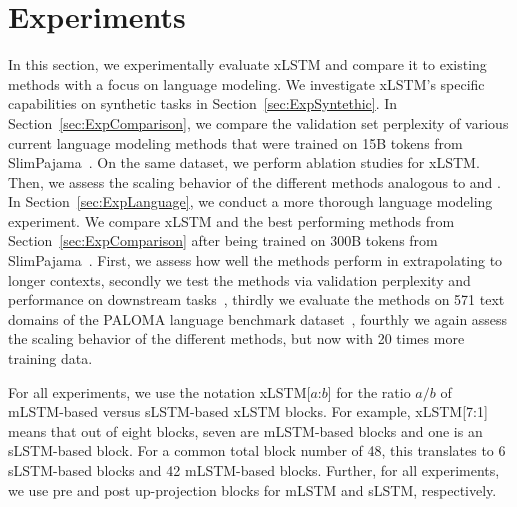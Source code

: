 \documentclass[dvipsnames]{article}
\begin{document}


\section{Experiments}
\label{sec:Exp}

In this section, we experimentally evaluate xLSTM 
and compare it to existing methods with a focus on language modeling.
We investigate xLSTM's specific capabilities on
synthetic tasks in Section~\ref{sec:ExpSyntethic}. 
In Section~\ref{sec:ExpComparison}, we compare the validation set perplexity
of various current language modeling methods that 
were trained on 15B tokens from SlimPajama~\citep{Soboleva:23}.
On the same dataset, we perform ablation studies for xLSTM.
Then, we assess the scaling behavior of the different methods
analogous to \citet{Kaplan:20} and \citet{Brown:20short}.
In Section~\ref{sec:ExpLanguage}, 
we conduct a more thorough language modeling experiment.
We compare xLSTM and the best performing methods 
from Section~\ref{sec:ExpComparison} after being trained on 
300B tokens from SlimPajama~\citep{Soboleva:23}.
First, we assess how well the methods perform in extrapolating to longer contexts,
secondly we test the methods via validation perplexity and performance 
on downstream tasks~\citep{Sutawika:24},
thirdly we evaluate the methods on 571 text domains of 
the PALOMA language benchmark dataset~\citep{Magnusson:23arxivshort},
fourthly we again assess the scaling behavior of the different methods, but
now with 20 times more training data.


\label{sec:xlstm_blocks_notation}
For all experiments, we use the 
notation xLSTM[$a$:$b$]
for the ratio $a/b$ of mLSTM-based versus sLSTM-based xLSTM blocks. 
For example, xLSTM[7:1] means that out of eight blocks, 
seven are mLSTM-based blocks and one is an sLSTM-based block. 
For a common total block number of 48, this translates to 
6 sLSTM-based blocks and 42 mLSTM-based blocks. 
Further, for all experiments, we use 
pre and post up-projection blocks for mLSTM and sLSTM, respectively. 
\end{document}
